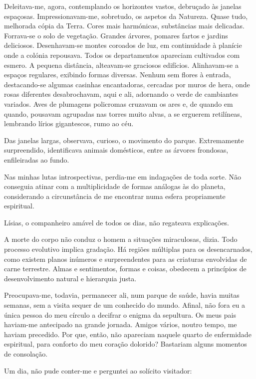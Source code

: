 \documentclass[portuguese,12pt,a4paper]{scrbook}
\begin{document}
	Deleitava-me, agora, contemplando os horizontes vastos, debruçado às janelas espaçosas. Impressionavam-me, sobretudo, os aspetos da Natureza. Quase tudo, melhorada cópia da Terra. Cores mais harmónicas, substâncias mais delicadas. Forrava-se o solo de vegetação. Grandes árvores, pomares fartos e jardins deliciosos. Desenhavam-se montes coroados de luz, em continuidade à planície onde a colónia repousava. Todos os departamentos apareciam cultivados com esmero. A pequena distância, alteavam-se graciosos edifícios. Alinhavam-se a espaços regulares, exibindo formas diversas. Nenhum sem flores à entrada, destacando-se algumas casinhas encantadoras, cercadas por muros de hera, onde rosas diferentes desabrochavam, aqui e ali, adornando o verde de cambiantes variados. Aves de plumagens policromas cruzavam os ares e, de quando em quando, pousavam agrupadas nas torres muito alvas, a se erguerem retilíneas, lembrando lírios gigantescos, rumo ao céu.
	
	Das janelas largas, observava, curioso, o movimento do parque. Extremamente surpreendido, identificava animais domésticos, entre as árvores frondosas, enfileiradas ao fundo.
	
	
	Nas minhas lutas introspectivas, perdia-me em indagações de toda sorte. Não conseguia atinar com a multiplicidade de formas análogas às do planeta, considerando a circunstância de me encontrar numa esfera propriamente espiritual.
	
	Lísias, o companheiro amável de todos os dias, não regateava explicações.
	
	A morte do corpo não conduz o homem a situações miraculosas, dizia. Todo processo evolutivo implica gradação. Há regiões múltiplas para os desencarnados, como existem planos inúmeros e surpreendentes para as criaturas envolvidas de carne terrestre. Almas e sentimentos, formas e coisas, obedecem a princípios de desenvolvimento natural e hierarquia justa.
	
	Preocupava-me, todavia, permanecer ali, num parque de saúde, havia muitas semanas, sem a visita sequer de um conhecido do mundo. Afinal, não fora eu a única pessoa do meu círculo a decifrar o enigma da sepultura. Os meus pais haviam-me antecipado na grande jornada. Amigos vários, noutro tempo, me haviam precedido. Por que, então, não apareciam naquele quarto de enfermidade espiritual, para conforto do meu coração dolorido? Bastariam alguns momentos de consolação.
	
	Um dia, não pude conter-me e perguntei ao solícito visitador:
	
\end{document}
